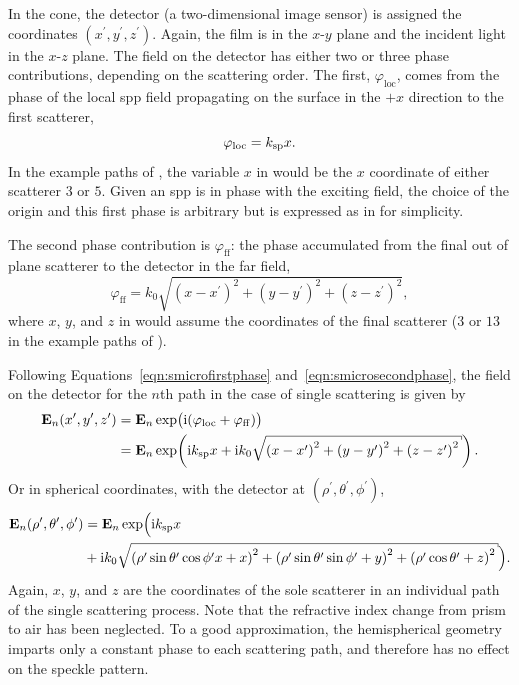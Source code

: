 In the cone, the detector (a two-dimensional image sensor) is assigned the
coordinates $(x^\prime,y^\prime,z^\prime)$.  Again, the film is in the
$x$-$y$ plane and the incident light in the $x$-$z$ plane.
The field on the detector has either two or three phase contributions,
depending on the scattering order. The first, $\varphi_\mathrm{loc}$, comes
from the phase of the local \gls{spp} field propagating on the surface in the
${+}x$ direction to the first scatterer,
\begin{equation}
\varphi_\mathrm{loc} = k_\mathrm{sp} x.
\label{eqn:smicrofirstphase}
\end{equation}
In the example paths of , the variable $x$ in
 would be the $x$
coordinate of either scatterer $3$ or $5$.  Given an \gls{spp} is in phase with the
exciting field, the choice of the origin and this first phase is arbitrary
but is expressed as in  for simplicity.

The second phase contribution is $\varphi_\mathrm{ff}$: the phase accumulated
from the final out of plane scatterer to the detector in the far field,
\begin{equation}
\varphi_\mathrm{ff} =
k_0\sqrt{{(x-x^\prime)}^2+{(y-y^\prime)}^2+{(z-z^\prime)}^2},
\label{eqn:smicrosecondphase}
\end{equation}
where $x$, $y$, and $z$ in  would assume the coordinates of the final scatterer
($3$ or $13$ in the example paths of ).

Following Equations~\ref{eqn:smicrofirstphase} and~\ref{eqn:smicrosecondphase},
the field on the detector for the $n$th path in the case of single scattering is given by
\begin{align}
\mathbf{E}_n(x^\prime,y^\prime,z^\prime) &=
\mathbf{E}_n\exp\bigl(\mi(\varphi_\mathrm{loc}+\varphi_\mathrm{ff})\bigr)\\
&= \mathbf{E}_n\exp\!\left(\mi\ksp x + %
\mi k_0\sqrt{{(x-x^\prime)}^2+{(y-y^\prime)}^2+{(z-z^\prime)}^2}\right).
\label{eqn:smicrosinglescattering}
\end{align}
Or in spherical coordinates, with the detector at
$(\rho^\prime,\theta^\prime,\phi^\prime)$,
\begin{align}
				\mathbf{E}_n(\rho^\prime,\theta^\prime,\phi^\prime) &= \mathbf{E}_n\exp\Bigl(\mi\ksp x \\
&+ \mi k_0\sqrt{{(\rho^\prime\sin\theta^\prime\cos\phi^\prime
x+x)}^2+{(\rho^\prime\sin\theta^\prime\sin\phi^\prime+y)}^2+{(\rho^\prime\cos\theta^\prime+z)}^2
} \Bigr).
\label{eqn:scattspherical}
\end{align}
Again, $x$, $y$, and $z$ are the coordinates of the sole scatterer in an
individual path of the single scattering process.  Note that the
refractive index change from prism to air has been neglected.  To a good
approximation, the hemispherical geometry imparts only a constant phase to
each scattering path, and therefore has no effect on the speckle pattern.

